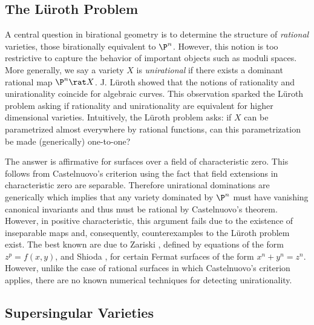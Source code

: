 \documentclass[12pt]{amsart}
\begin{document}
\subsection*{The L\"{u}roth Problem}

A central question in birational geometry is to determine the structure of \textit{rational} varieties, those birationally equivalent to $\P^n$. However, this notion is too restrictive to capture the behavior of important objects such as moduli spaces. More generally, we say a variety $X$ is \textit{unirational} if there exists a dominant rational map $\P^n \rat X$. J. L\"{u}roth showed \cite{Luroth} that the notions of rationality and unirationality coincide for algebraic curves. This observation sparked the L\"{u}roth problem asking if rationality and unirationality are equivalent for higher dimensional varieties. Intuitively, the L\"{u}roth problem asks: if $X$ can be parametrized almost everywhere by rational functions, can this parametrization be made (generically) one-to-one? 
\par
The answer is affirmative for surfaces over a field of characteristic zero. This follows from Castelnuovo's criterion using the fact that field extensions in characteristic zero are separable. Therefore unirational dominations are generically \etale which implies that any variety dominated by $\P^n$ must have vanishing canonical invariants and thus must be rational by Castelnuovo's theorem. However, in positive characteristic, this argument fails due to the existence of inseparable maps and, consequently, counterexamples to the L\"{u}roth problem exist. The best known are due to Zariski \cite{zariski1958}, defined  by equations of the form $z^p = f(x, y)$, and Shioda \cite{shioda1974}, for certain Fermat surfaces of the form $x^n + y^n = z^n$. However, unlike the case of rational surfaces in which Castelnuovo's criterion applies, there are no known numerical techniques for detecting unirationality.

\subsection*{Supersingular Varieties}
\end{document}
